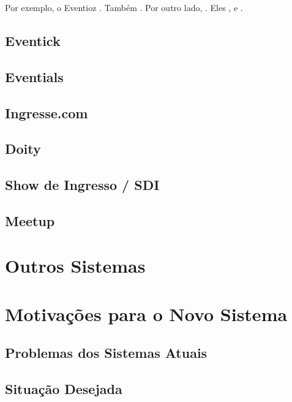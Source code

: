 \documentclass[a4paper]{abntex2}
\begin{document}
Por exemplo, o Eventioz . Também . Por outro lado, . Eles , e .

\subsection{Eventick}
\subsection{Eventials}
\subsection{Ingresse.com}
\subsection{Doity}
\subsection{Show de Ingresso / SDI}
\subsection{Meetup}


\section{Outros Sistemas}

\section{Motivações para o Novo Sistema}

\subsection{Problemas dos Sistemas Atuais}

\subsection{Situação Desejada}
\end{document}
